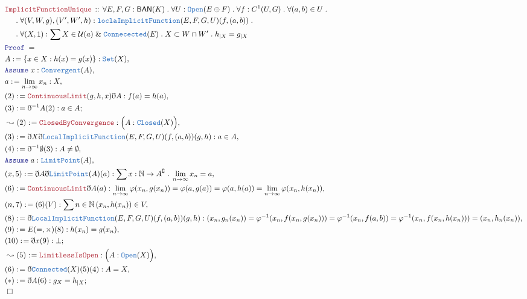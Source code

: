 \documentclass[12pt]{scrartcl}
\newcommand{\TYPE}[1]{\textcolor{NavyBlue}{\mathtt{#1}}}
\newcommand{\LOGIC}[1]{\textcolor{Blue}{\mathtt{#1}}}
\newcommand{\THM}[1]{\textcolor{Maroon}{\mathtt{#1}}}
\renewcommand{\.}{\; . \;}
\newcommand{\de}{: \kern 0.1pc =}
\newcommand{\Theorem}[2]{& \THM{#1} \, :: \, #2 \\ & \Proof = \\ }
\newcommand{\NewLine}{\\ & \kern 1pc}
\newcommand{\Page}[1]{\begin{align*} #1 \end{align*}   }
\newcommand{ \bd }{ \ByDef }
\renewcommand{\And}{\; \& \;}
\newcommand{\Nat}{\mathbb{N} }
\newcommand{\Set}{\TYPE{Set}}
\renewcommand{\c}{\complement}
\newcommand{\Say}[3]{& #1 \de #2 : #3, \\}
\newcommand{\Conclude}[3]{& #1 \de #2 : #3; \\}
\newcommand{\Derive}[3]{& \leadsto #1 \de #2 : #3, \\}
\newcommand{\A}{\LOGIC{Assume} \;}
\newcommand{\Assume}[2]{& \A #1 : #2, \\}
\newcommand{\QED}{\; \square}
\newcommand{\EndProof}{& \QED \\}
\newcommand{\ByDef}{\eth}
\newcommand{\Proof}{\LOGIC{Proof} \; }
\newcommand{\BAN}{\mathsf{BAN}} %
\begin{document}
\Page{
	\Theorem{ImplicitFunctionUnique}{ 
		\forall E,F,G : \BAN(K) \. \forall U : \TYPE{Open}(E \oplus F) \. \forall f : C^1(U,G) \. \forall (a,b) \in U \. 
		\NewLine \.
		\forall (V,W,g), (V',W',h) : \TYPE{loclaImplicitFunction}(E,F,G,U)(f,(a,b)) \.
		\NewLine \.
		\forall (X,1) : \sum X \in \mathcal{U}(a) \And \TYPE{Connecected}(E) \. X \subset W \cap W' \.
		h_{|X} = g_{|X}
	}
	\Say{A}{\{ x \in X : h(x) = g(x)    \} }{\Set(X)}
	\Assume{x}{\TYPE{Convergent}(A)}
	\Say{a}{\lim_{n \to \infty} x_n}{X}
	\Say{(2)}{\THM{ContinuousLimit}(g,h,x)\bd A}{ f(a) = h(a)}
	\Conclude{(3)}{\bd^{-1}A(2)}{a \in A}
	\Derive{(2)}{\THM{ClosedByConvergence}}{\Big( A : \TYPE{Closed}(X) \Big)}
	\Say{(3)}{\bd X \bd \TYPE{LocalImplicitFunction}(E,F,G,U)(f,(a,b))(g,h)}{a \in A}
	\Say{(4)}{\bd^{-1} \emptyset (3)}{A \neq \emptyset}
	\Assume{a}{\TYPE{LimitPoint}(A)}
	\Say{(x,5)}{\bd A \bd \TYPE{LimitPoint}(A)(a) }{ \sum x : \Nat \to A^\c \. \lim_{n \to \infty} x_n = a   }
	\Say{(6)}{ \THM{ContinuousLimit} \bd A(a) }{ \lim_{n \to \infty} \varphi(x_n,g(x_n)) = \varphi(a,g(a)) = \varphi(a,h(a)) = \lim_{n \to \infty} \varphi(x_n,h(x_n))  }
	\Say{(n,7)}{ (6)(V)}{\sum n \in \Nat \, (x_n,h(x_n)) \in V }
	\Say{(8)}{\bd \TYPE{LocalImplicitFunction}(E,F,G,U)(f,(a,b))(g,h)}{ (x_n,g_n(x_n)) = \varphi^{-1}(x_n,f(x_n,g(x_n))) = \varphi^{-1}(x_n,f(a,b)) = \varphi^{-1}(x_n,f(x_n,h(x_n))) = (x_n,h_n(x_n))  }
	\Say{(9)}{E(=,\times)(8)}{h(x_n) = g(x_n)}
	\Conclude{(10)}{\bd x (9)}{\bot}
	\Derive{(5)}{\THM{LimitlessIsOpen}}{\Big( A : \TYPE{Open}(X) \Big)}
	\Say{(6)}{\bd \TYPE{Connected}(X)(5)(4)}{A = X}
	\Conclude{(*)}{ \bd A(6)  }{ g_{X} = h_{|X}  }
	\EndProof
}
\end{document}
